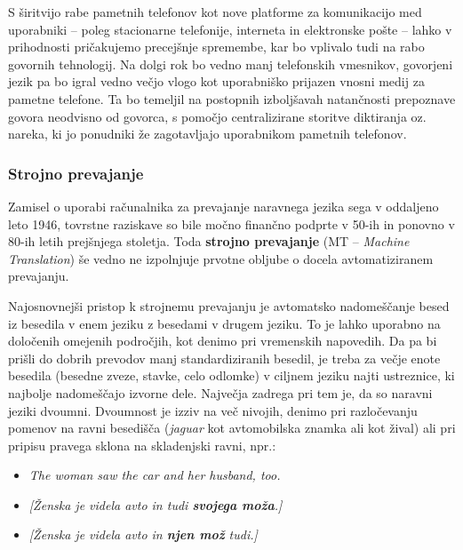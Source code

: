 \begin{multicols}{2}
S širitvijo rabe pametnih telefonov kot nove platforme za komunikacijo med uporabniki – poleg stacionarne telefonije, interneta in elektronske pošte – lahko v prihodnosti pričakujemo precejšnje spremembe, kar bo vplivalo tudi na rabo go\-vornih tehnologij. Na dolgi rok bo vedno manj telefonskih vmesnikov, go\-vorjeni jezik pa bo igral vedno večjo vlogo kot uporabniško prijazen vnosni medij za pametne telefone. Ta bo temeljil na postopnih izboljšavah natančnosti prepoznave go\-vora neodvisno od go\-vorca, s pomočjo centralizirane storitve diktiranja oz. nareka, ki jo ponudniki že zagotav\-ljajo uporabnikom pametnih telefonov.

\subsubsection{Strojno prevajanje}

Zamisel o uporabi računalnika za prevajanje naravnega jezika sega v oddaljeno leto 1946, tovrstne raziskave so bile močno finančno podprte v 50-ih in ponovno v 80-ih letih prejšnjega stoletja. Toda \textbf{strojno prevajanje} (MT – \textit{Machine Translation}) še vedno ne izpolnjuje prvotne ob\-ljube o docela avtomatiziranem prevajanju.


Naj\-osnovnejši pristop k stroj\-nemu prevajanju je avtomatsko nadomeščanje besed iz besedila v enem jeziku z besedami v drugem jeziku. To je lahko uporabno na določenih omejenih področjih, kot denimo pri vremenskih napovedih. Da pa bi prišli do dobrih prevodov manj standardiziranih besedil, je treba za večje enote besedila (besedne zveze, stavke, celo odlomke) v ciljnem jeziku naj\-ti ustreznice, ki naj\-bolje nadomeščajo izvorne dele. Naj\-večja zadrega pri tem je, da so naravni jeziki dvoumni. Dvoumnost je izziv na več nivojih, denimo pri razločevanju po\-menov na ravni besedišča (\textit{jaguar} kot avtomobilska znamka ali kot žival) ali pri pripisu pravega sklona na skladenjski ravni, npr.:

\begin{itemize}
\item \textit{The woman saw the car and her husband, too.} 
\item \textit{{[}Ženska je videla avto in tudi \textbf{svojega moža}.{]}}
\item \textit{{[}Ženska je videla avto in \textbf{njen mož} tudi.{]}}
\end{itemize}


\end{multicols}
